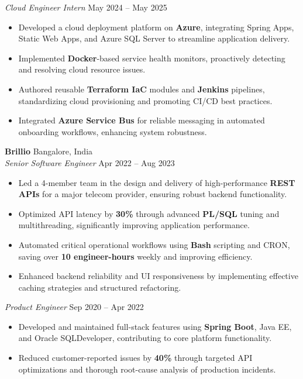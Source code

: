 \documentclass[10pt]{article}
\begin{document}
\textit{Cloud Engineer Intern} \hfill May 2024 -- May 2025
\begin{itemize}
    \item Developed a cloud deployment platform on \textbf{Azure}, integrating Spring Apps, Static Web Apps, and Azure SQL Server to streamline application delivery.
    \item Implemented \textbf{Docker}-based service health monitors, proactively detecting and resolving cloud resource issues.
    \item Authored reusable \textbf{Terraform IaC} modules and \textbf{Jenkins} pipelines, standardizing cloud provisioning and promoting CI/CD best practices.
    \item Integrated \textbf{Azure Service Bus} for reliable messaging in automated onboarding workflows, enhancing system robustness.
\end{itemize}

\textbf{Brillio} \hfill Bangalore, India \\
\textit{Senior Software Engineer} \hfill Apr 2022 -- Aug 2023
\begin{itemize}
    \item Led a 4-member team in the design and delivery of high-performance \textbf{REST APIs} for a major telecom provider, ensuring robust backend functionality.
    \item Optimized API latency by \textbf{30\%} through advanced \textbf{PL/SQL} tuning and multithreading, significantly improving application performance.
    \item Automated critical operational workflows using \textbf{Bash} scripting and CRON, saving over \textbf{10 engineer-hours} weekly and improving efficiency.
    \item Enhanced backend reliability and UI responsiveness by implementing effective caching strategies and structured refactoring.
\end{itemize}

\textit{Product Engineer} \hfill Sep 2020 -- Apr 2022
\begin{itemize}
    \item Developed and maintained full-stack features using \textbf{Spring Boot}, Java EE, and Oracle SQLDeveloper, contributing to core platform functionality.
    \item Reduced customer-reported issues by \textbf{40\%} through targeted API optimizations and thorough root-cause analysis of production incidents.
\end{itemize}
\end{document}
